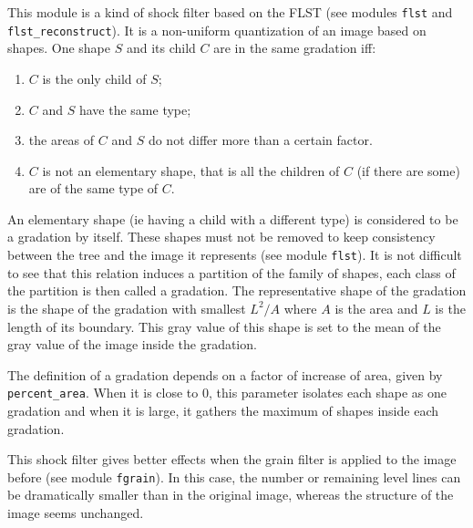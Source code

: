 This module is a kind of shock filter based on the FLST (see modules
\verb+flst+ and \verb+flst_reconstruct+). It is a non-uniform quantization
of an image based on shapes.
One shape $S$ and its child $C$ are in the same gradation iff:
\begin{enumerate}
\item $C$ is the only child of $S$;
\item $C$ and $S$ have the same type;
\item the areas of $C$ and $S$ do not differ more than a certain factor.
\item $C$ is not an elementary shape, that is all the children of $C$ (if
there are some) are of the same type of $C$.
\end{enumerate}
An elementary shape (ie having a child with a different type) is considered to
be a gradation by itself. These shapes must not be removed to keep consistency
between the tree and the image it represents (see module \verb+flst+).
It is not difficult 
to see that this relation induces a partition of the family of
shapes, each class of the partition is then called a gradation.  The
representative shape of the gradation is the shape of the gradation with
smallest $L^2/A$ where $A$ is the area and $L$ is the length of its boundary.
This gray value of this shape is set to the mean of the gray value of the
image inside the gradation.

The definition of a gradation depends on a factor of increase of area, given
by \verb+percent_area+. When it is close to 0, this parameter isolates
each shape as one gradation and when it is 
large, it gathers the maximum of shapes
inside each gradation.

This shock filter gives better effects when the grain filter is 
applied to the image before
(see module \verb+fgrain+). In this case, the number
or remaining level lines can be dramatically smaller than in the original
image, whereas the structure of the image seems unchanged.
